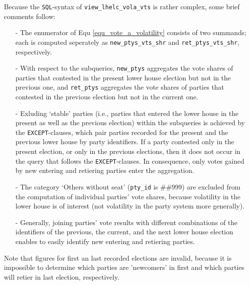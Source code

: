 Because the \texttt{SQL}-syntax of \texttt{view\_lhelc\_vola\_vts} is rather complex, some brief comments follow:
\begin{itemize}
\item[-]{The enumerator of Equ \ref{equ_vote_a_volatility} consists of two summands; each is computed seperately as \texttt{new\_ptys\_vts\_shr} and \texttt{ret\_ptys\_vts\_shr}, respectively.}
\item[-]{With respect to the subqueries, 
\texttt{new\_ptys} aggregates the vote shares of parties that contested in the present lower house election but not in the previous one, and 
 \texttt{ret\_ptys} aggregates the vote shares of parties that contested in the previous election but not in the current one.}
\item[-]{%
  Exluding `stable' parties (i.e., parties that entered the lower house in the present as well as the previous election) within the subqueries is achieved by the \texttt{EXCEPT}-clauses, which pair parties recorded for the present and the previous lower house by party identifiers. 
  If a party contested only in the present election, or only in the previous elections, then it does not occur in the query that follows the \texttt{EXCEPT}-clauses. 
  In consequence, only votes gained by new entering and retiering parties enter the aggregation.}
\item[-]{The category `Others without seat' (\texttt{pty\_id} is \#\#999) are excluded from the computation of individual parties' vote shares, because volatility in the lower house is of interest (not volatility in the party system more generally).}
\item[-]{Generally, joining parties' vote results with different combinations of the identifiers of the previous, the current, and the next lower house election enables to easily identify new entering and retiering parties.}
\end{itemize}
Note that figures for first an last recorded elections are invalid, because it is impossible to determine which parties are 'newcomers' in first and which parties will retier in last election, respectively. 



